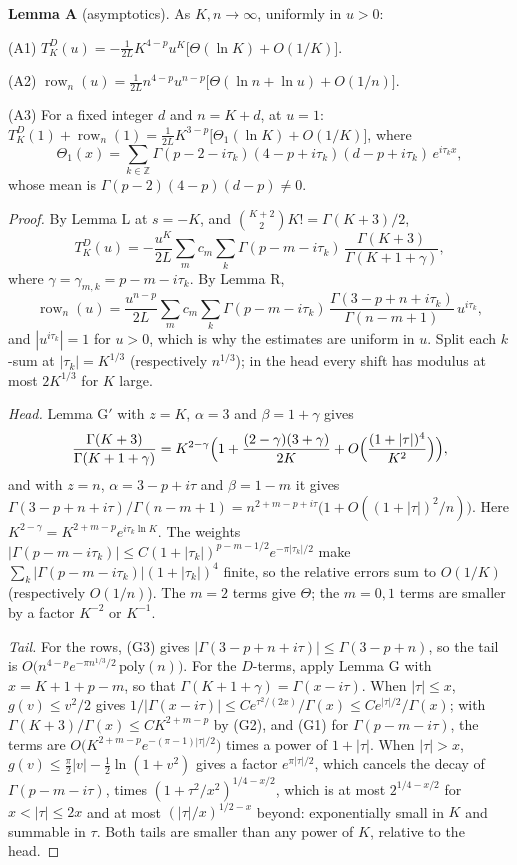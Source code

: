 \documentclass[11pt]{article}
\newcommand{\row}{\operatorname{row}}
\begin{document}
\medskip
\noindent\textbf{Lemma A} (asymptotics). As $K,n\to\infty$, uniformly in $u>0$:

(A1) $T^D_K(u)=-\frac{1}{2L}K^{4-p}u^K\bigl[\Theta(\ln K)+O(1/K)\bigr]$.

(A2) $\row_n(u)=\frac{1}{2L}n^{4-p}u^{n-p}\bigl[\Theta(\ln n+\ln u)+O(1/n)\bigr]$.

(A3) For a fixed integer $d$ and $n=K+d$, at $u=1$: $T^D_K(1)+\row_n(1)=\frac{1}{2L}K^{3-p}\bigl[\Theta_1(\ln K)+O(1/K)\bigr]$, where
\[
\Theta_1(x)=\sum_{k\in\mathbb{Z}}\Gamma(p-2-i\tau_k)(4-p+i\tau_k)(d-p+i\tau_k)\,e^{i\tau_kx},
\]
whose mean is $\Gamma(p-2)(4-p)(d-p)\ne0$.

\begin{proof}
By Lemma L at $s=-K$, and $\binom{K+2}{2}K!=\Gamma(K+3)/2$,
\[
T^D_K(u)=-\frac{u^K}{2L}\sum_mc_m\sum_k\Gamma(p-m-i\tau_k)\,\frac{\Gamma(K+3)}{\Gamma(K+1+\gamma)},
\]
where $\gamma=\gamma_{m,k}=p-m-i\tau_k$. By Lemma R,
\[
\row_n(u)=\frac{u^{n-p}}{2L}\sum_mc_m\sum_k\Gamma(p-m-i\tau_k)\,\frac{\Gamma(3-p+n+i\tau_k)}{\Gamma(n-m+1)}\,u^{i\tau_k},
\]
and $|u^{i\tau_k}|=1$ for $u>0$, which is why the estimates are uniform in $u$. Split each $k$-sum at $|\tau_k|=K^{1/3}$ (respectively $n^{1/3}$); in the head every shift has modulus at most $2K^{1/3}$ for $K$ large.

\emph{Head.} Lemma G$'$ with $z=K$, $\alpha=3$ and $\beta=1+\gamma$ gives
\[
\frac{\Gamma(K+3)}{\Gamma(K+1+\gamma)}=K^{2-\gamma}\Bigl(1+\frac{(2-\gamma)(3+\gamma)}{2K}+O\Bigl(\frac{(1+|\tau|)^4}{K^2}\Bigr)\Bigr),
\]
and with $z=n$, $\alpha=3-p+i\tau$ and $\beta=1-m$ it gives $\Gamma(3-p+n+i\tau)/\Gamma(n-m+1)=n^{2+m-p+i\tau}\bigl(1+O((1+|\tau|)^2/n)\bigr)$. Here $K^{2-\gamma}=K^{2+m-p}e^{i\tau_k\ln K}$. The weights $|\Gamma(p-m-i\tau_k)|\le C(1+|\tau_k|)^{p-m-1/2}e^{-\pi|\tau_k|/2}$ make $\sum_k|\Gamma(p-m-i\tau_k)|(1+|\tau_k|)^4$ finite, so the relative errors sum to $O(1/K)$ (respectively $O(1/n)$). The $m=2$ terms give $\Theta$; the $m=0,1$ terms are smaller by a factor $K^{-2}$ or $K^{-1}$.

\emph{Tail.} For the rows, (G3) gives $|\Gamma(3-p+n+i\tau)|\le\Gamma(3-p+n)$, so the tail is $O\bigl(n^{4-p}e^{-\pi n^{1/3}/2}\,\mathrm{poly}(n)\bigr)$. For the $D$-terms, apply Lemma G with $x=K+1+p-m$, so that $\Gamma(K+1+\gamma)=\Gamma(x-i\tau)$. When $|\tau|\le x$, $g(v)\le v^2/2$ gives $1/|\Gamma(x-i\tau)|\le Ce^{\tau^2/(2x)}/\Gamma(x)\le Ce^{|\tau|/2}/\Gamma(x)$; with $\Gamma(K+3)/\Gamma(x)\le CK^{2+m-p}$ by (G2), and (G1) for $\Gamma(p-m-i\tau)$, the terms are $O\bigl(K^{2+m-p}e^{-(\pi-1)|\tau|/2}\bigr)$ times a power of $1+|\tau|$. When $|\tau|>x$, $g(v)\le\frac\pi2|v|-\frac12\ln(1+v^2)$ gives a factor $e^{\pi|\tau|/2}$, which cancels the decay of $\Gamma(p-m-i\tau)$, times $(1+\tau^2/x^2)^{1/4-x/2}$, which is at most $2^{1/4-x/2}$ for $x<|\tau|\le2x$ and at most $(|\tau|/x)^{1/2-x}$ beyond: exponentially small in $K$ and summable in $\tau$. Both tails are smaller than any power of $K$, relative to the head.


\end{proof}
\end{document}
